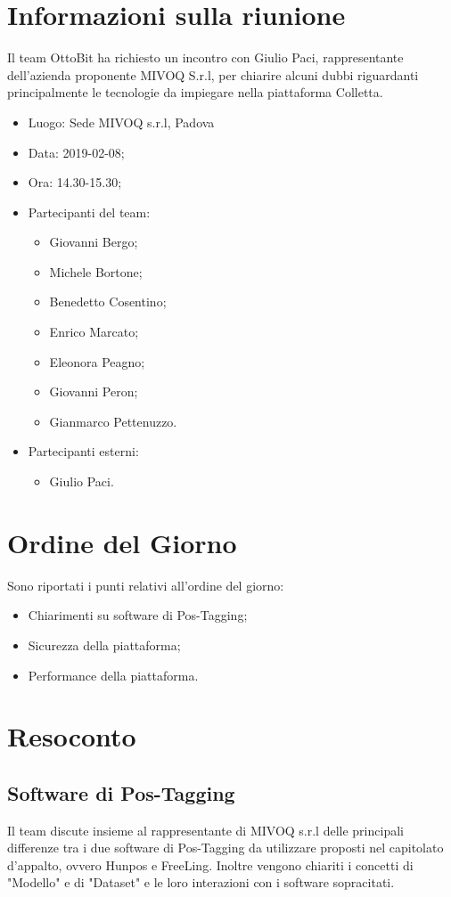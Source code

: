\documentclass[11pt,a4paper]{article}
\begin{document}
	\section{Informazioni sulla riunione}
	Il team OttoBit ha richiesto un incontro con Giulio Paci, rappresentante dell'azienda proponente MIVOQ S.r.l, per chiarire alcuni dubbi riguardanti principalmente le tecnologie da impiegare nella piattaforma Colletta.
	\begin{itemize}
		\item Luogo: Sede MIVOQ s.r.l, Padova
		\item Data: 2019-02-08;
		\item Ora: 14.30-15.30;
		\item Partecipanti del team:
		\begin{itemize}
			\item Giovanni Bergo;
			\item Michele Bortone;
			\item Benedetto Cosentino;
			\item Enrico Marcato;
			\item Eleonora Peagno;
			\item Giovanni Peron;
			\item Gianmarco Pettenuzzo.
			
		\end{itemize}
	\item Partecipanti esterni:
	\begin{itemize}
		\item Giulio Paci.
	\end{itemize}
	\end{itemize}
	
	\section{Ordine del Giorno}
	Sono riportati i punti relativi all'ordine del giorno:
	\begin{itemize}
		\item Chiarimenti su software di Pos-Tagging;
		\item Sicurezza della piattaforma;
		\item Performance della piattaforma.
	\end{itemize}
	
	\section{Resoconto}
	\subsection{Software di Pos-Tagging}
	Il team discute insieme al rappresentante di MIVOQ s.r.l delle principali differenze tra i due software di Pos-Tagging da utilizzare proposti nel capitolato d'appalto, ovvero Hunpos e FreeLing.
	Inoltre vengono chiariti i concetti di "Modello" e di "Dataset" e le loro interazioni con i software sopracitati.
\end{document}
